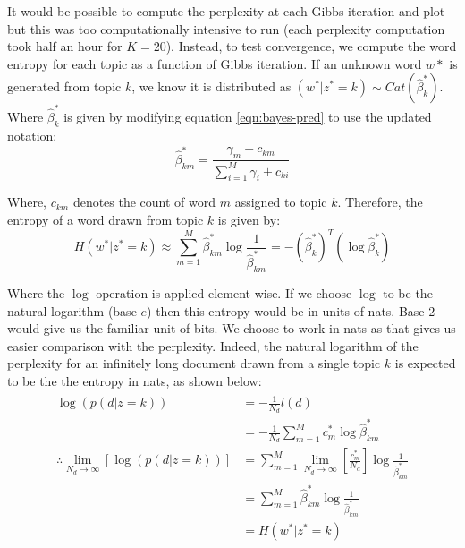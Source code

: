 \documentclass[]{article}
\newcommand{\betastar}{\hat{\beta}^{*}}
\begin{document}
It would be possible to compute the perplexity at each Gibbs iteration and plot but this was too computationally intensive to run (each perplexity computation took half an hour for $K=20$). Instead, to test convergence, we compute the word entropy for each topic as a function of Gibbs iteration. If an unknown word $w*$ is generated from topic $k$, we know it is distributed as $(w^* | z^* = k) \sim Cat(\betastar_k)$. Where $\betastar_k$ is given by modifying equation \ref{eqn:bayes-pred} to use the updated notation:
%
\begin{equation}
	\betastar_{km} = \frac{\gamma_m + c_{km}}{\sum_{i=1}^{M} \gamma_i + c_{ki}}
\end{equation}

Where, $c_{km}$ denotes the count of word $m$ assigned to topic $k$. Therefore, the entropy of a word drawn from topic $k$ is given by:
%
\begin{equation}
	H(w^* | z^* = k) \approx \sum_{m=1}^{M} \betastar_{km} \log \frac{1}{\betastar_{km}} = - (\betastar_k)^T (\log \betastar_k )
\end{equation}

Where the $\log$ operation is applied element-wise. If we choose $\log$ to be the natural logarithm (base $e$) then this entropy would be in units of nats. Base 2 would give us the familiar unit of bits. We choose to work in nats as that gives us easier comparison with the perplexity. Indeed, the natural logarithm of the perplexity for an infinitely long document drawn from a single topic $k$ is expected to be the the entropy in nats, as shown below:
%
\begin{align}
\begin{split}
	\log(p(d|z=k)) &= - \frac{1}{N_d} l(d) \\
	&= - \frac{1}{N_d} \sum_{m=1}^{M} c^*_m \log \betastar_{km} \\
	\therefore \lim_{N_d \rightarrow \infty} [\log(p(d|z=k))] &= \sum_{m=1}^{M} \lim_{N_d \rightarrow \infty} \left[ \frac{c^*_m}{N_d} \right] \log \frac{1}{\betastar_{km}} \\
	&= \sum_{m=1}^{M} \betastar_{km} \log \frac{1}{\betastar_{km}} \\
	&= H(w^* | z^* = k)
\end{split}
\end{align}
\end{document}
